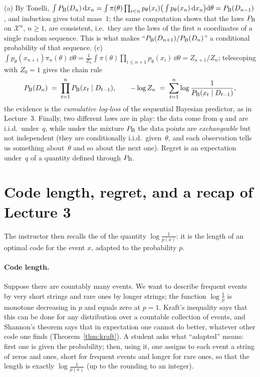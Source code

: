 \begin{beyond}
(a) By Tonelli, $\int P_{\mathrm{B}}(D_n)\,\mathrm{d} x_n=\int\pi(\theta)\prod_{i<n}p_\theta(x_i)\big(\int p_\theta(x_n)\,\mathrm{d} x_n\big)\mathrm{d}\theta=P_{\mathrm{B}}(D_{n-1})$, and induction gives total mass~$1$; the same computation shows that the laws $P_{\mathrm{B}}$ on $\mathcal X^n$, $n\ge1$, are consistent, i.e.\ they are the laws of the first $n$ coordinates of a single random sequence. This is what makes ``$P_{\mathrm{B}}(D_{n+1})/P_{\mathrm{B}}(D_n)$'' a conditional probability of that sequence. (c) $\int p_\theta(x_{n+1})\pi_n(\theta)\,\dd\theta=\frac1{Z_n}\int\pi(\theta)\prod_{i\le n+1}p_\theta(x_i)\,\dd\theta=Z_{n+1}/Z_n$; telescoping with $Z_0=1$ gives the chain rule
\[
   P_{\mathrm{B}}(D_n)\;=\;\prod_{t=1}^{n}P_{\mathrm{B}}(x_t\mid D_{t-1}),\qquad -\log Z_n\;=\;\sum_{t=1}^n\log\frac1{P_{\mathrm{B}}(x_t\mid D_{t-1})},
\]
the evidence is the \emph{cumulative log-loss} of the sequential Bayesian predictor, as in Lecture~3. Finally, two different laws are in play: the data come from $q$ and are i.i.d.\ under~$q$, while under the mixture $P_{\mathrm{B}}$ the data points are \emph{exchangeable} but not independent (they are conditionally i.i.d.\ given~$\theta$, and each observation tells us something about~$\theta$ and so about the next one). Regret is an expectation under~$q$ of a quantity defined through $P_{\mathrm{B}}$.
\end{beyond}

\section{Code length, regret, and a recap of Lecture 3}\label{sec:L5-code}
The instructor then recalls the  of the quantity $\log\frac1{p(x)}$: it is the length of an optimal code for the event $x$, adapted to the probability $p$.

\paragraph{Code length.}
Suppose there are countably many events. We want to describe frequent events by very short strings and rare ones by longer strings; the function $\log\frac1p$ is monotone decreasing in $p$ and equals zero at $p=1$. Kraft's inequality says that this can be done for any distribution over a countable collection of events, and Shannon's theorem says that in expectation one cannot do better, whatever other code one finds (Theorem~\ref{thm:kraft}). A student asks what ``adapted'' means: first one is given the probability; then, using it, one assigns to each event a string of zeros and ones, short for frequent events and longer for rare ones, so that the length is exactly $\log\frac1{p(x)}$ (up to the rounding to an integer).

